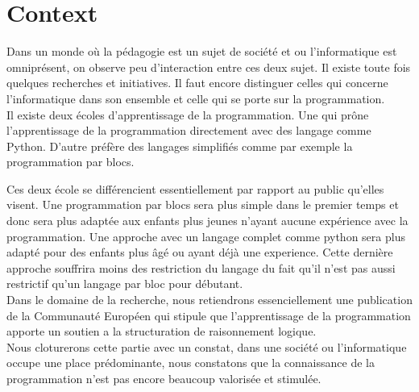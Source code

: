 \section{Context}
\label{intro-context}
Dans un monde où la pédagogie est un sujet de société et ou l'informatique est omniprésent, on observe peu d'interaction entre ces deux sujet. Il existe toute fois quelques recherches et initiatives. Il faut encore distinguer celles qui concerne l'informatique dans son ensemble et celle qui se porte sur la programmation.\\

Il existe deux écoles d'apprentissage de la programmation. Une qui prône l'apprentissage de la programmation directement avec des langage comme Python. D'autre préfère des langages simplifiés comme par exemple la programmation par blocs. 

Ces deux école se différencient essentiellement par rapport au public qu'elles visent. Une programmation par blocs sera plus simple dans le premier temps et donc sera plus adaptée aux enfants plus jeunes n'ayant aucune expérience avec la programmation. Une approche avec un langage complet comme python sera plus adapté pour des enfants plus âgé ou ayant déjà une experience. Cette dernière approche souffrira moins des restriction du langage du fait qu'il n'est pas aussi restrictif qu'un langage par bloc pour débutant.\\

Dans le domaine de la recherche, nous retiendrons essenciellement une publication de la Communauté Européen qui stipule que l'apprentissage de la programmation apporte un soutien a la structuration de raisonnement logique.\\

Nous cloturerons cette partie avec un constat, dans une société ou l'informatique occupe une place prédominante, nous constatons que la connaissance de la programmation n'est pas encore beaucoup valorisée et stimulée. 
